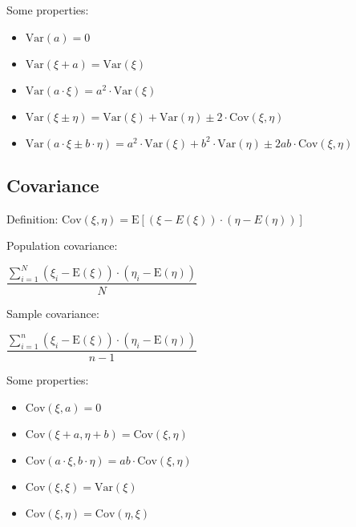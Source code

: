 \documentclass[10pt, a4paper, landscape]{extarticle}
\newcommand{\E}{\mathrm{E}}
\newcommand{\Var}{\mathrm{Var}}
\newcommand{\Cov}{\mathrm{Cov}}
\begin{document}
\begin{multicols}{3}
Some properties:

\begin{itemize}[leftmargin=*]
	\item $\Var(a) = 0$
	\item $\Var(\xi + a) = \Var(\xi)$
	\item $\Var(a \cdot \xi) = a^2 \cdot \Var(\xi)$
	\item $\Var(\xi \pm \eta) = \Var(\xi) + \Var(\eta) \pm 2 \cdot \Cov(\xi, \eta)$
	\item $\Var(a \cdot \xi \pm b \cdot \eta) = a^2 \cdot \Var(\xi) + b^2 \cdot \Var(\eta) \pm 2 a b \cdot \Cov(\xi, \eta)$
\end{itemize}

\subsection*{Covariance}

Definition: \quad $\Cov(\xi, \eta) = \E[(\xi - E(\xi)) \cdot (\eta - E(\eta))]$

\begin{multicols}{2}
	Population covariance:
	\begin{center}
		$\dfrac{\sum_{i=1}^{N} (\xi_i - \E(\xi)) \cdot (\eta_i - \E(\eta))}{N}$
	\end{center}
\columnbreak
	Sample covariance:
	\begin{center}
		$\dfrac{\sum_{i=1}^{n} (\xi_i - \E(\xi)) \cdot (\eta_i - \E(\eta))}{n - 1}$
	\end{center}
\end{multicols}

Some properties:

\begin{itemize}[leftmargin=*]
	\item $\Cov(\xi, a) = 0$
	\item $\Cov(\xi + a, \eta + b) = \Cov(\xi, \eta)$
	\item $\Cov(a \cdot \xi, b \cdot \eta) = a b \cdot \Cov(\xi, \eta)$
	\item $\Cov(\xi, \xi) = \Var(\xi)$
	\item $\Cov(\xi, \eta) = \Cov(\eta, \xi)$
\end{itemize}

\end{multicols}

\pagebreak
\end{document}

